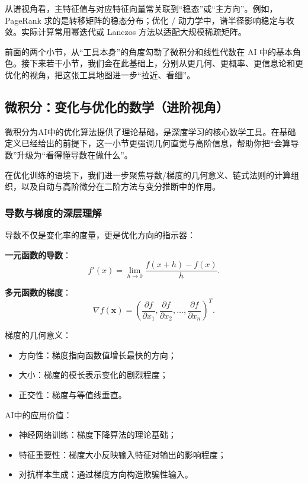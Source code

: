从谱视角看，主特征值与对应特征向量常关联到“稳态”或“主方向”。例如，PageRank 求的是转移矩阵的稳态分布；优化 / 动力学中，谱半径影响稳定与收敛。实际计算常用幂迭代或 Lanczos 方法以适配大规模稀疏矩阵。

\vspace{0.5em}
前面的两个小节，从“工具本身”的角度勾勒了微积分和线性代数在 AI 中的基本角色。接下来若干小节，我们会在此基础上，分别从更几何、更概率、更信息论和更优化的视角，把这张工具地图进一步“拉近、看细”。

\subsection{微积分：变化与优化的数学（进阶视角）}

微积分为AI中的优化算法提供了理论基础，是深度学习的核心数学工具。在基础定义已经给出的前提下，这一小节更强调几何直觉与高阶信息，帮助你把“会算导数”升级为“看得懂导数在做什么”。

在优化训练的语境下，我们进一步聚焦导数/梯度的几何意义、链式法则的计算组织，以及自动与高阶微分在二阶方法与变分推断中的作用。

\subsubsection{导数与梯度的深层理解}

导数不仅是变化率的度量，更是优化方向的指示器：

\textbf{一元函数的导数}：
$$
f'(x) = \lim_{h \to 0} \frac{f(x+h) - f(x)}{h}.
$$

\textbf{多元函数的梯度}：
$$
\nabla f(\mathbf{x}) = \left(\frac{\partial f}{\partial x_1}, \frac{\partial f}{\partial x_2}, \ldots, \frac{\partial f}{\partial x_n}\right)^T.
$$

梯度的几何意义：
\begin{itemize}
  \item 方向性：梯度指向函数值增长最快的方向；
  \item 大小：梯度的模长表示变化的剧烈程度；
  \item 正交性：梯度与等值线垂直。
\end{itemize}

AI中的应用价值：
\begin{itemize}
  \item 神经网络训练：梯度下降算法的理论基础；
  \item 特征重要性：梯度大小反映输入特征对输出的影响程度；
  \item 对抗样本生成：通过梯度方向构造欺骗性输入。
\end{itemize}

